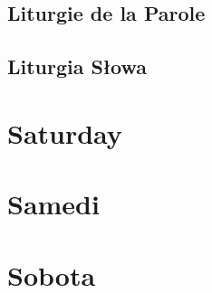 \newpage
\section[Liturgie de la Parole]{Liturgie de la Parole}
\begin{french}







\end{french}

\newpage
\section[Liturgia Słowa]{Liturgia Słowa}
\begin{polish}







\end{polish}

\chapter[Saturday * Samedi * Sobota][Samedi]{Saturday\\\myrulev\\Samedi\\\myrulev\\Sobota}
